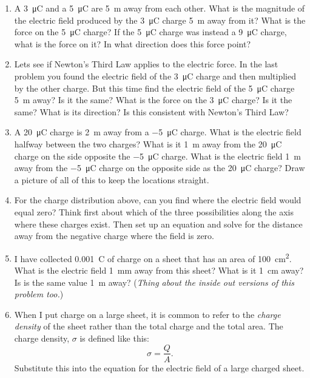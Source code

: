 \begin{enumerate}
\item
A \SI{3}{\micro\coulomb} and a \SI{5}{\micro\coulomb} are \SI{5}{\meter} away from each other. What is the magnitude of the electric field produced by the \SI{3}{\micro\coulomb} charge \SI{5}{\meter} away from it? What is the force on the \SI{5}{\micro\coulomb} charge? If the \SI{5}{\micro\coulomb} charge was instead a \SI{9}{\micro\coulomb} charge, what is the force on it? In what direction does this force point?

\item
Lets see if Newton's Third Law applies to the electric force. In the last problem you found the electric field of the \SI{3}{\micro\coulomb} charge and then multiplied by the other charge. But this time find the electric field of the \SI{5}{\micro\coulomb} charge \SI{5}{\meter} away? Is it the same? What is the force on the \SI{3}{\micro\coulomb} charge? Is it the same? What is its direction? Is this consistent with Newton's Third Law?

\item
A \SI{+20}{\micro\coulomb} charge is \SI{2}{\meter} away from a \SI{-5}{\micro\coulomb} charge. What is the electric field halfway between the two charges? What is it \SI{1}{\meter} away from the \SI{+20}{\micro\coulomb} charge on the side opposite the \SI{-5}{\micro\coulomb} charge. What is the electric field \SI{1}{\meter} away from the \SI{-5}{\micro\coulomb} charge on the opposite side as the \SI{+20}{\micro\coulomb} charge? Draw a picture of all of this to keep the locations straight. \giantskip

\item
For the charge distribution above, can you find where the electric field would equal zero? Think first about which of the three possibilities along the axis where these charges exist. Then set up an equation and solve for the distance away from the negative charge where the field is zero.

\item
I have collected \SI{0.001}{\coulomb} of charge on a sheet that has an area of \SI{100}{\centi\meter\squared}. What is the electric field \SI{1}{mm} away from this sheet? What is it \SI{1}{cm} away? Is is the same value \SI{1}{m} away? (\emph{Thing about the inside out versions of this problem too.})

\item
When I put charge on a large sheet, it is common to refer to the \emph{charge density} of the sheet rather than the total charge and the total area. The charge density, $\sigma$ is defined like this: \[\sigma = \frac{Q}{A}.\] Substitute this into the equation for the electric field of a large charged sheet.


\end{enumerate}
